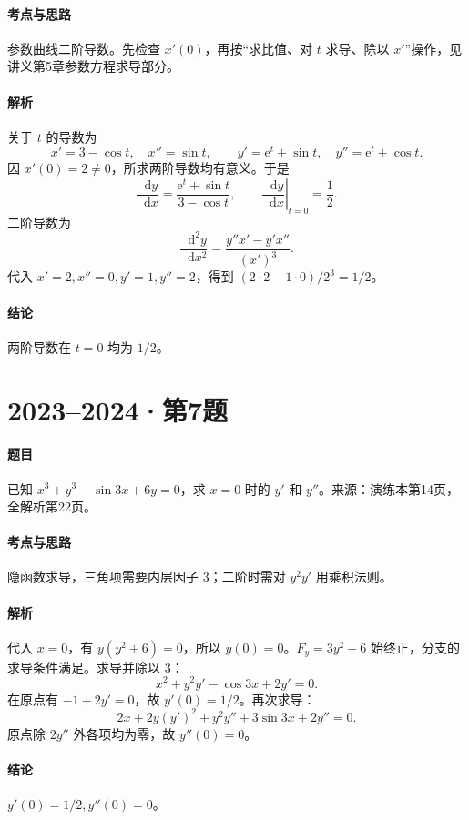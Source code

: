 \documentclass[UTF8,fontset=fandol,12pt,oneside,openany]{ctexrep}
\newcommand{\dd}{\mathop{}\!\mathrm d}
\newcommand{\ee}{\mathrm e}
\theoremstyle{definition}
\begin{document}
\paragraph{考点与思路}参数曲线二阶导数。先检查 $x'(0)$，再按“求比值、对 $t$ 求导、除以 $x'$”操作，见讲义第5章参数方程求导部分。
\paragraph{解析}关于 $t$ 的导数为
\[
 x'=3-\cos t,\quad x''=\sin t,\qquad
 y'=\ee^t+\sin t,\quad y''=\ee^t+\cos t.
\]
因 $x'(0)=2\ne0$，所求两阶导数均有意义。于是
\[
 \frac{\dd y}{\dd x}=\frac{\ee^t+\sin t}{3-\cos t},
 \qquad \left.\frac{\dd y}{\dd x}\right|_{t=0}=\frac12.
\]
二阶导数为
\[
 \frac{\dd^2y}{\dd x^2}=\frac{y''x'-y'x''}{(x')^3}.
\]
代入 $x'=2,x''=0,y'=1,y''=2$，得到 $(2\cdot2-1\cdot0)/2^3=1/2$。
\paragraph{结论}两阶导数在 $t=0$ 均为 $1/2$。

\par\addvspace{18pt}\noindent\begin{minipage}{\linewidth}
\section{2023--2024·第7题}
\paragraph{题目}已知 $x^3+y^3-\sin3x+6y=0$，求 $x=0$ 时的 $y'$ 和 $y''$。来源：演练本第14页，全解析第22页。
\end{minipage}\par
\paragraph{考点与思路}隐函数求导，三角项需要内层因子 $3$；二阶时需对 $y^2y'$ 用乘积法则。
\paragraph{解析}代入 $x=0$，有 $y(y^2+6)=0$，所以 $y(0)=0$。$F_y=3y^2+6$ 始终正，分支的求导条件满足。求导并除以 $3$：
\[
 x^2+y^2y'-\cos3x+2y'=0.
\]
在原点有 $-1+2y'=0$，故 $y'(0)=1/2$。再次求导：
\[
 2x+2y(y')^2+y^2y''+3\sin3x+2y''=0.
\]
原点除 $2y''$ 外各项均为零，故 $y''(0)=0$。
\paragraph{结论}$y'(0)=1/2,y''(0)=0$。
\end{document}

